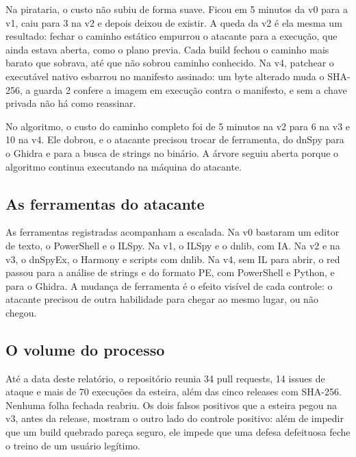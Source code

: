 Na pirataria, o custo não subiu de forma suave. Ficou em 5 minutos da v0 para a v1, caiu para 3 na v2 e depois deixou de existir. A queda da v2 é ela mesma um resultado: fechar o caminho estático empurrou o atacante para a execução, que ainda estava aberta, como o plano previa. Cada build fechou o caminho mais barato que sobrava, até que não sobrou caminho conhecido. Na v4, patchear o executável nativo esbarrou no manifesto assinado: um byte alterado muda o SHA-256, a guarda 2 confere a imagem em execução contra o manifesto, e sem a chave privada não há como reassinar.

No algoritmo, o custo do caminho completo foi de 5 minutos na v2 para 6 na v3 e 10 na v4. Ele dobrou, e o atacante precisou trocar de ferramenta, do dnSpy para o Ghidra e para a busca de strings no binário. A árvore seguiu aberta porque o algoritmo continua executando na máquina do atacante.

\subsection{As ferramentas do atacante}

As ferramentas registradas acompanham a escalada. Na v0 bastaram um editor de texto, o PowerShell e o ILSpy. Na v1, o ILSpy e o dnlib, com IA. Na v2 e na v3, o dnSpyEx, o Harmony e scripts com dnlib. Na v4, sem IL para abrir, o red passou para a análise de strings e do formato PE, com PowerShell e Python, e para o Ghidra. A mudança de ferramenta é o efeito visível de cada controle: o atacante precisou de outra habilidade para chegar ao mesmo lugar, ou não chegou.

\subsection{O volume do processo}

Até a data deste relatório, o repositório reunia 34 pull requests, 14 issues de ataque e mais de 70 execuções da esteira, além das cinco releases com SHA-256. Nenhuma folha fechada reabriu. Os dois falsos positivos que a esteira pegou na v3, antes da release, mostram o outro lado do controle positivo: além de impedir que um build quebrado pareça seguro, ele impede que uma defesa defeituosa feche o treino de um usuário legítimo.
